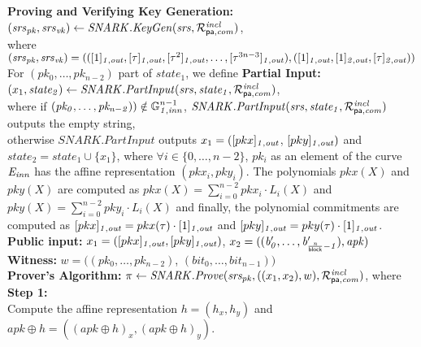 \noindent \textbf{Proving and Verifying Key Generation:} $(\mathit{srs}_{\mathit{pk}}, \mathit{srs}_{\mathit{vk}}) \leftarrow \mathit{SNARK.KeyGen}(\mathit{srs}, \mathcal{R}^{\mathit{incl}}_{\mathsf{pa},\mathit{com}})$, \\
where $(\mathit{srs}_{\mathit{pk}}, \mathit{srs}_{\mathit{vk}}) = 
(([1]_{\mathit{1,out}}, [\tau]_{\mathit{1,out}}, [\tau^2]_{\mathit{1,out}}, \ldots, [\tau^{3n-3}]_{\mathit{1,out}}), ([1]_{\mathit{1,out}}, [1]_{\mathit{2,out}}, [\tau]_{\mathit{2,out}}))$ \\

\noindent For $(\mathit{pk_0}, \ldots, \mathit{pk_{n-2}})$ part of $\mathit{state_1}$, we define 
\textbf{Partial Input:} $(x_1, \mathit{state_2}) \leftarrow \mathit{SNARK.PartInput}(\mathit{srs}, \mathit{state_1}, \mathcal{R}^{\mathit{incl}}_{\mathsf{pa},\mathit{com}})$, \\
where if $(\mathit{pk_0}, \ldots, \mathit{pk_{n-2}})) \notin \mathbb{G}_{\mathit{1,inn}}^{n-1}$, $\mathit{SNARK.PartInput}(\mathit{srs}, \mathit{state_1}, \mathcal{R}^{\mathit{incl}}_{\mathsf{pa},\mathit{com}})$ outputs the empty string, \\ otherwise 
 $\mathit{SNARK.PartInput}$ outputs $x_1 = ([pkx]_{\mathit{1,out}}$, $[pky]_{\mathit{1,out}})$ and $\mathit{state_2} = \mathit{state_1} \cup \{ x_1\}$, where $\forall i \in \{0, \ldots, n-2\}$, $\mathit{pk_i}$ as an element of the curve $\mathit{E}_{\mathit{inn}}$ 
has the affine representation $(\mathit{pkx_i}, \mathit{pky_i})$. The polynomials $pkx(X)$ and $pky(X)$ are computed as $pkx(X) = \sum_{i=0}^{n-2} \mathit{pkx_i} \cdot L_i(X)$ 
and $pky(X) = \sum_{i=0}^{n-2} \mathit{pky_i} \cdot L_i(X)$ and finally, the polynomial commitments are computed as 
$[pkx]_{\mathit{1,out}} = pkx(\tau) \cdot [1]_{\mathit{1,out}}$ and $[pky]_{\mathit{1,out}} = pky(\tau) \cdot [1]_{\mathit{1,out}}$.\\

\noindent \textbf{Public input:} $x_1 = ([pkx]_{\mathit{1,out}}, [pky]_{\mathit{1,out}})$, $x_2 = ((\mathit{b'_{0}}, \ldots, \mathit{b'_{\frac{n}{\mathsf{block}}-1}}), \mathit{apk})$\\

\noindent \textbf{Witness:}
$w = ((\mathit{pk_0}, \ldots, \mathit{pk_{n-2}})$, $(\mathit{bit}_0, \ldots, \mathit{bit_{n-1}}))$ \\

\noindent \textbf{Prover's Algorithm:} $ \pi \leftarrow \mathit{SNARK.Prove}(\mathit{srs_{pk}}, ((x_1, x_2), w), \mathcal{R}^{\mathit{incl}}_{\mathsf{pa},\mathit{com}})$, where\\

\noindent \textbf{Step 1:} \\
\noindent Compute the affine representation $h = (h_x, h_y)$ and  $apk \oplus h = ((apk \oplus h)_{x}, (apk \oplus h)_{y})$. \\

